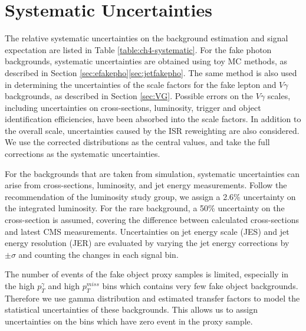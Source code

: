 \documentclass[thesis.tex]{subfiles}
\renewcommand\_{\textunderscore\allowbreak}
\begin{document}
\section{Systematic Uncertainties}
The relative systematic uncertainties on the background estimation and signal expectation are listed in Table \ref{table:ch4-systematic}. For the fake photon backgrounds, systematic uncertainties are obtained using toy MC methods, as described in Section \ref{sec:efakepho}\ref{sec:jetfakepho}. The same method is also used in determining the uncertainties of the scale factors for the fake lepton and $V\gamma$ backgrounds, as described in Section \ref{sec:VG}. Possible errors on the $V\gamma$ scales, including uncertainties on cross-sections, luminosity, trigger and object identification efficiencies, have been absorbed into the scale factors. In addition to the overall scale, uncertainties caused by the ISR reweighting are also considered. We use the corrected distributions as the central values, and take the full corrections as the systematic uncertainties.

For the backgrounds that are taken from simulation, systematic uncertainties can arise from cross-sections, luminosity, and jet energy measurements.  Follow the recommendation of the luminosity study group, we assign a 2.6\% uncertainty on the integrated luminosity. For the rare background, a 50\% uncertainty on the cross-section is assumed, covering the difference between calculated cross-sections and latest CMS measurements. Uncertainties on jet energy scale (JES) and jet energy resolution (JER) are evaluated by varying the jet energy corrections by $\pm\sigma$ and counting the changes in each signal bin.

The number of events of the fake object proxy samples is limited, especially in the high $p_T^{\gamma}$ and high $p_T^{miss}$ bins which contains very few fake object backgrounds. Therefore we use gamma distribution and estimated transfer factors to model the statistical uncertainties of these backgrounds. This allows us to assign uncertainties on the bins which have zero event in the proxy sample. 
\end{document}
